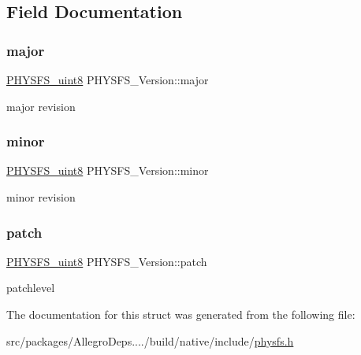 \subsection{Field Documentation}
\mbox{\label{struct_p_h_y_s_f_s___version_ac60a805b6b7c342cb1718356f5be4dc2}} 
\subsubsection{\texorpdfstring{major}{major}}
{\footnotesize\ttfamily \hyperlink{physfs_8h_abb348466106a912e03cf63f494a30356}{P\+H\+Y\+S\+F\+S\+\_\+uint8} P\+H\+Y\+S\+F\+S\+\_\+\+Version\+::major}

major revision \mbox{\label{struct_p_h_y_s_f_s___version_a753a884de5c4ef33bff3dfb2e0bb1a0c}} 
\subsubsection{\texorpdfstring{minor}{minor}}
{\footnotesize\ttfamily \hyperlink{physfs_8h_abb348466106a912e03cf63f494a30356}{P\+H\+Y\+S\+F\+S\+\_\+uint8} P\+H\+Y\+S\+F\+S\+\_\+\+Version\+::minor}

minor revision \mbox{\label{struct_p_h_y_s_f_s___version_a565624d6f0785e5cb4c706583c682e20}} 
\subsubsection{\texorpdfstring{patch}{patch}}
{\footnotesize\ttfamily \hyperlink{physfs_8h_abb348466106a912e03cf63f494a30356}{P\+H\+Y\+S\+F\+S\+\_\+uint8} P\+H\+Y\+S\+F\+S\+\_\+\+Version\+::patch}

patchlevel 

The documentation for this struct was generated from the following file\+:\begin{DoxyCompactItemize}
\item 
src/packages/\+Allegro\+Deps..../build/native/include/\hyperlink{physfs_8h}{physfs.\+h}\end{DoxyCompactItemize}
